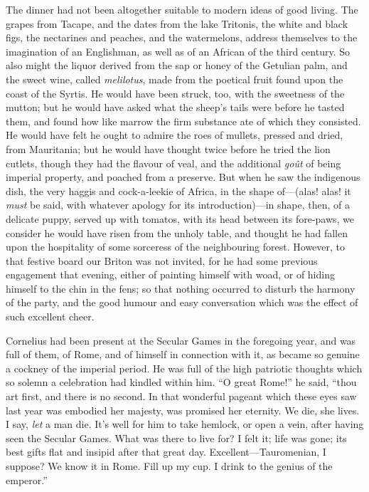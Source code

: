 The dinner had not been altogether suitable to modern ideas of good
living. The grapes from Tacape, and the dates from the lake Tritonis,
the white and black figs, the nectarines and peaches, and the
watermelons, address themselves to the imagination of an Englishman,
as well as of an African of the third century. So also might the
liquor derived from the sap or honey of the Getulian palm, and the
sweet wine, called \emph{melilotus}, made from the poetical fruit
found upon the coast of the Syrtis. He would have been struck, too,
with the sweetness of the mutton; but he would have asked what the
sheep's tails were before he tasted them, and found how like marrow
the firm substance ate of which they consisted. He would have felt he
ought to admire the roes of mullets, pressed and dried, from
Mauritania; but he would have thought twice before he tried the lion
cutlets, though they had the flavour of veal, and the additional \emph{goût}
of being imperial property, and poached from a preserve. But when he
saw the indigenous dish, the very haggis and cock-a-leekie of Africa,
in the shape of—(alas! alas! it \emph{must} be said, with whatever
apology for its introduction)—in shape, then, of a delicate puppy,
served up with tomatos, with its head between its fore-paws, we
consider he would have risen from the unholy table, and thought he had
fallen upon the hospitality of some sorceress of the neighbouring
forest. However, to that festive board our Briton was not invited, for
he had some previous engagement that evening, either of painting
himself with woad, or of hiding himself to the chin in the fens; so
that nothing occurred to disturb the harmony of the party, and the
good humour and easy conversation which was the effect of such
excellent cheer.

Cornelius had been present at the Secular Games in the foregoing
year, and was full of them, of Rome, and of himself in connection with
it, as became so genuine a cockney of the imperial period. He was full
of the high patriotic thoughts which so solemn a celebration had
kindled within him. ``O great Rome!'' he said, ``thou art
first, and there is no second. In that wonderful pageant which these
eyes saw last year was embodied her majesty, was promised her
eternity. We die, she lives. I say, \emph{let} a man die. It's well
for him to take hemlock, or open a vein, after having seen the Secular
Games. What was there to live for? I felt it; life was gone; its best
gifts flat and insipid after that great day. Excellent—Tauromenian,
I suppose? We know it in Rome. Fill up my cup. I drink to the genius
of the emperor.''

